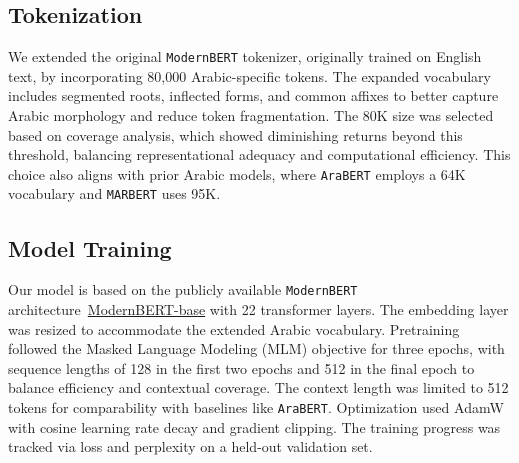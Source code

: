 \documentclass[11pt]{article}
\begin{document}



\subsection{Tokenization}
We extended the original \texttt{ModernBERT} tokenizer, originally trained on English text, by incorporating 80,000 Arabic-specific tokens. The expanded vocabulary includes segmented roots, inflected forms, and common affixes to better capture Arabic morphology and reduce token fragmentation. The 80K size was selected based on coverage analysis, which showed diminishing returns beyond this threshold, balancing representational adequacy and computational efficiency. This choice also aligns with prior Arabic models, where \texttt{AraBERT} employs a 64K vocabulary and \texttt{MARBERT} uses 95K.


\subsection{Model Training}
Our model is based on the publicly available \texttt{ModernBERT} architecture~\href{https://huggingface.co/answerdotai/ModernBERT-base}{ModernBERT-base} with 22 transformer layers. The embedding layer was resized to accommodate the extended Arabic vocabulary. Pretraining followed the Masked Language Modeling (MLM) objective for three epochs, with sequence lengths of 128 in the first two epochs and 512 in the final epoch to balance efficiency and contextual coverage. The context length was limited to 512 tokens for comparability with baselines like \texttt{AraBERT}. Optimization used AdamW with cosine learning rate decay and gradient clipping. The training progress was tracked via loss and perplexity on a held-out validation set.
\end{document}
